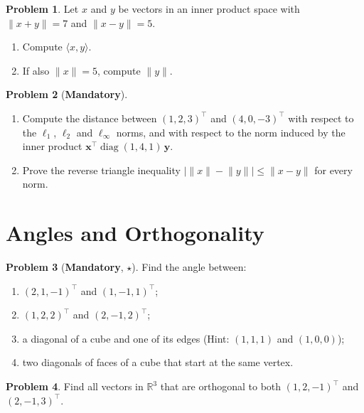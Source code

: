 \documentclass[11pt]{article}
\theoremstyle{definition}
\newtheorem{problem}{Problem}[section]
\newcommand{\mandatory}{\textcolor{red!70!black}{\textbf{Mandatory}}}
\newcommand{\norm}[1]{\lVert #1 \rVert}
\newcommand{\ip}[2]{\langle #1, #2 \rangle}
\DeclareMathOperator{\diag}{diag}
\begin{document}
\begin{problem}\label{pr:polarization}
    Let $x$ and $y$ be vectors in an inner product space with $\norm{x + y} = 7$ and $\norm{x - y} = 5$.
    \begin{enumerate}[label=(\alph*)]
        \item Compute $\ip{x}{y}$.
        \item If also $\norm{x} = 5$, compute $\norm{y}$.
    \end{enumerate}
\end{problem}

\begin{problem}[\mandatory]\label{pr:dist}
    \begin{enumerate}[label=(\alph*)]
        \item Compute the distance between $(1, 2, 3)^\top$ and $(4, 0, -3)^\top$ with respect to the $\ell_1$, $\ell_2$ and $\ell_\infty$ norms, and with respect to the norm induced by the inner product $\mathbf{x}^\top \diag(1, 4, 1)\, \mathbf{y}$.
        \item Prove the reverse triangle inequality $\big|\norm{x} - \norm{y}\big| \leq \norm{x - y}$ for every norm.
    \end{enumerate}
\end{problem}

\section{Angles and Orthogonality}

\begin{problem}[\mandatory, $\star$]\label{pr:angles}
    Find the angle between:
    \begin{enumerate}[label=(\alph*)]
        \item $(2, 1, -1)^\top$ and $(1, -1, 1)^\top$;
        \item $(1, 2, 2)^\top$ and $(2, -1, 2)^\top$;
        \item a diagonal of a cube and one of its edges (Hint: $(1, 1, 1)$ and $(1, 0, 0)$);
        \item two diagonals of faces of a cube that start at the same vertex.
    \end{enumerate}
\end{problem}

\begin{problem}\label{pr:orth-to-two}
    Find all vectors in $\mathbb{R}^3$ that are orthogonal to both $(1, 2, -1)^\top$ and $(2, -1, 3)^\top$.
\end{problem}
\end{document}
